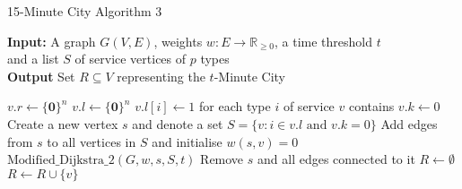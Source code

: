 \begin{algorithm}[H]
    \caption{15-Minute City Algorithm 3} \label{alg:15mc3}
    \textbf{Input:} A graph $G(V,E)$, weights $w:E\rightarrow\mathbb{R}_{\geq 0}$, a time threshold $t$ \\  and a list $S$ of service vertices of $p$ types\\
    \textbf{Output} Set $R\subseteq V$ representing the $t$-Minute City
    \begin{algorithmic}
            \State $v.r \gets \{\mathbf{0}\}^{n}$
            \State $v.l \gets \{\mathbf{0}\}^{n}$
        \EndFor
            \State $v.l[i] \gets 1$ for each type $i$ of service $v$ contains
            \State $v.k \gets 0$ 
        \EndFor
            \State Create a new vertex $s$ and denote a set $S = \{v: i\in v.l \text{ and } v.k = 0\}$
            \State Add edges from $s$ to all vertices in $S$ and initialise $w(s,v)=0$
            \State $\text{Modified\_Dijkstra\_2}(G,w,s,S,t)$
            \State Remove $s$ and all edges connected to it
        \EndFor
        \State $R\gets\emptyset$
                \State $R \gets R\cup \{v\}$
            \EndIf
        \EndFor
    \end{algorithmic}
\end{algorithm}

